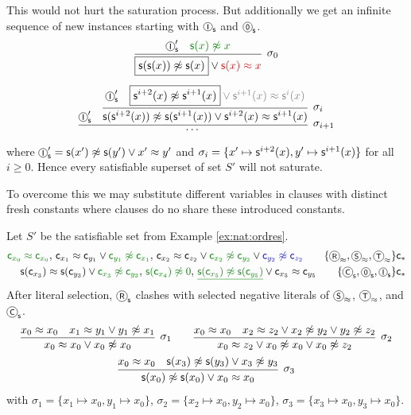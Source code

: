 \begin{example}
This would not hurt the saturation process.
But additionally we get an infinite sequence of new instances starting with \( \axiom{I}_\msucc \) and \( \axiom{0}_\msucc \).
	\begin{gather*}
	\infer[ \sigma_0 ]{
		\boxed{\msucc (\msucc (x)) \mNE \msucc (x)} \lor\colLo \msucc (x)\mEQ x
	}{
		\axiom{I}'_\msucc & \colHi\msucc (x) \mNE x
	}
	\\[0.5em]
	\infer[ \sigma_{i+1}]{ \cdots }{\axiom{I}'_\msucc&
	\infer[ \sigma_i]{
		\msucc (\msucc^{i+2} (x)) \mNE \msucc (\msucc^{i+1} (x)) \lor \msucc^{i+2} (x)\mEQ\msucc^{i+1} (x)
	}{
		\axiom{I}'_\msucc & \boxed{\msucc^{i+2} (x) \mNE \msucc^{i+1} (x)}\colG \lor \msucc^{i+1} (x)\mEQ\msucc^{i}(x)
	}
	}
	\end{gather*}
	where \( \axiom{I}'_\msucc = \msucc (x') \mNE \msucc (y') \lor x'\mEQ y' \) and 
	\( \sigma_i = \{ x'\mapsto \mathsf{s}^{i+2} (x), y'\mapsto \mathsf{s}^{i+1} (x)\} \) for all \( i\geq 0 \).
	Hence every satisfiable superset of set \( S' \) will not saturate.
\end{example}
% 
To overcome this we may substitute different variables in clauses 
with distinct fresh constants where clauses do no share these introduced constants.
\begin{example} Let \( S' \) 
	be the satisfiable set from Example \vref{ex:nat:ordres}.
	\begin{align*}
{\colHi \mc_{x_0} \mEQ \mc_{x_0}}
,\,
{\mc_{x_1} \mEQ \mc_{y_1}} \lor {\colHi \mc_{y_1} \mNE \mc_{x_1}}
,\,
{\mc_{x_2} \mEQ \mc_{z_2}} \lor {\colHi \mc_{x_2} \mNE \mc_{y_2}} \lor {\colN \mc_{y_2}\mNE \mc_{z_2}}
\tag*{\( \{\axiom{R}_\mEQ,\axiom{S}_\mEQ,\axiom{T}_\mEQ\}{\mc_*} \)}
\\
{ \msucc(\mc_{x_3}) \mEQ \msucc(\mc_{y_3})} \lor {\colHi \mc_{x_3}\mNE \mc_{y_3}}
,\,
{\colHi \msucc(\mc_{x_4})\mNE 0}
,\,
\underline{\colHi \msucc(\mc_{x_5}) \mNE \msucc(\mc_{y_5})} \lor \mc_{x_5 }\mEQ \mc_{y_5}
\tag*{\(\{\axiom{C}_\msucc,\axiom{0}_\msucc,\axiom{I}_\msucc\}{\mc_*} \)}
\end{align*}
After literal selection, \( \axiom{R}_\msucc \) clashes with selected negative literals
of \( \axiom{S}_\mEQ \), \( \axiom{T}_\mEQ \), and \( \axiom{C}_\msucc \).
\begin{gather*}
\infer[\sigma_1]{
	x_0 \mEQ x_0 \lor x_0 \mNE x_0
}{
	x_0 \mEQ x_0 & x_1 \mEQ y_1 \lor y_1 \mNE x_1 
}
\qquad
\infer[\sigma_2]{
	x_0 \mEQ z_2 \lor x_0 \mNE x_0 \lor x_0 \mNE z_2
}{
	x_0 \mEQ x_0 & x_2 \mEQ z_2 \lor x_2 \mNE y_2 \lor y_2 \mNE z_2
}
\\
\infer[\sigma_3]{
	\msucc(x_0) \mNE \msucc(x_0) \lor x_0 \mEQ x_0
}{
	x_0 \mEQ x_0 & \msucc(x_3) \mNE \msucc(y_3) \lor x_3 \mNE y_3
}
\end{gather*}
with \( \sigma_1 = \{ x_1\mapsto x_0, y_1 \mapsto x_0 \}\),
\( \sigma_2 = \{ x_2\mapsto x_0, y_2 \mapsto x_0 \}  \),
\( \sigma_3 = \{ x_3\mapsto x_0, y_3 \mapsto x_0 \} \).
\end{example}

